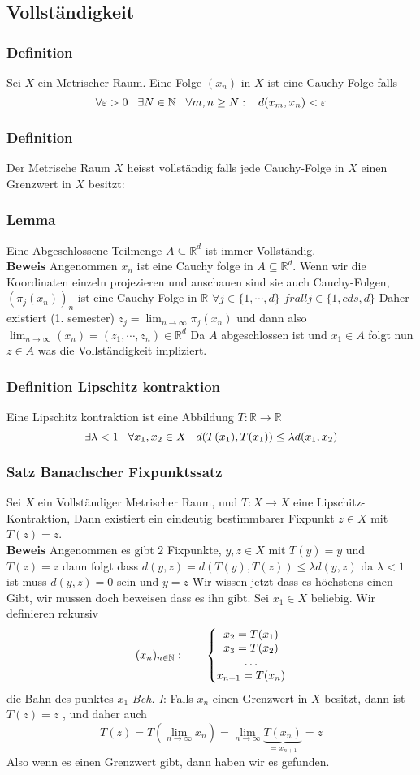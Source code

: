 \documentclass{article}
\newcommand{\mspc}{\hspace{0.7cm}}
\newcommand{\smspc}{\hspace{0.3cm}}
\newcommand{\satz}[1]{\subsubsection*{Satz {#1}}}
\newcommand{\beweis}{\\\textbf{Beweis }}
\newcommand{\lemma}[1]{\subsubsection*{Lemma {#1}}}
\newcommand{\definition}[1]{\subsubsection*{Definition {#1}}}
\begin{document}
\subsection*{Vollständigkeit}
\definition{} Sei $X$ ein Metrischer Raum. Eine Folge $(x_n)$ in $X$ ist eine Cauchy-Folge falls \[\forall \varepsilon >0 \smspc \exists N\in \mathbb{N}\smspc \forall m,n \ge N:\smspc d(x_m,x_n)<\varepsilon\]
\definition{} Der Metrische Raum $X$ heisst vollständig falls jede Cauchy-Folge in $X$ einen Grenzwert in $X$ besitzt:
\lemma{} Eine Abgeschlossene Teilmenge $A \subseteq \mathbb{R}^d$ ist immer Vollständig.
\beweis Angenommen $x_n$ ist eine Cauchy folge in $A\subseteq \mathbb{R}^d$. Wenn wir die Koordinaten einzeln projezieren und anschauen sind sie auch Cauchy-Folgen, $(\pi_j(x_n))_n$ ist eine Cauchy-Folge in $\mathbb{R}$ $\forall j\in\lbrace 1,\cdots , d\rbrace$ $frall j\in\lbrace 1,cds , d\rbrace$ Daher existiert (1. semester) $z_j=\lim_{n\rightarrow\infty}\pi_j(x_n)$  und dann also $\lim_{n\rightarrow\infty}(x_n)=(z_1,\cdots,z_n)\in \mathbb{R}^d$ Da $A$ abgeschlossen ist 
und $x_1\in A$ folgt nun $z\in A$ was die Vollständigkeit impliziert.
\definition{Lipschitz kontraktion}
Eine Lipschitz kontraktion ist eine Abbildung $T:\mathbb{R}\rightarrow \mathbb{R}$
\[\exists \lambda<1\smspc \forall x_1,x_2\in X\smspc d(T(x_1), T(x_1))\le \lambda d(x_1,x_2)\]
\satz{Banachscher Fixpunktssatz}
Sei $X$ ein Vollständiger Metrischer Raum, und $T:X \rightarrow X$ eine Lipschitz-Kontraktion, Dann existiert ein eindeutig bestimmbarer Fixpunkt $z\in X$ mit $T(z)=z$.
\beweis Angenommen es gibt $2$ Fixpunkte, $y,z\in X$ mit $T(y)=y$ und $T(z)=z$ dann folgt dass $d(y,z)=d(T(y),T(z))\le \lambda d(y,z)$ da $\lambda <1$ ist muss $d(y,z)=0$ sein und $y=z$
Wir wissen jetzt dass es höchstens einen Gibt, wir mussen doch beweisen dass es ihn gibt.
\newline Sei $x_1\in X$ beliebig. Wir definieren rekursiv \[(x_n)_{n\in\mathbb{N}}:\mspc\left\lbrace\begin{matrix}x_2=T(x_1)\\x_3=T(x_2)\\\hdots\\x_{n+1}=T(x_n)\end{matrix}\right.\]
die Bahn des punktes $x_1$ \newline \textit{Beh. I}: Falls $x_n$ einen Grenzwert in $X$ besitzt, dann ist $T(z)=z$ , und daher auch \[T(z)=T(\lim_{n\rightarrow\infty}x_n)=\lim_{n\rightarrow\infty}\underset{=x_{n+1}}{\underbrace{T(x_n)}}=z\]
Also wenn es einen Grenzwert gibt, dann haben wir es gefunden.\newline
\end{document}

